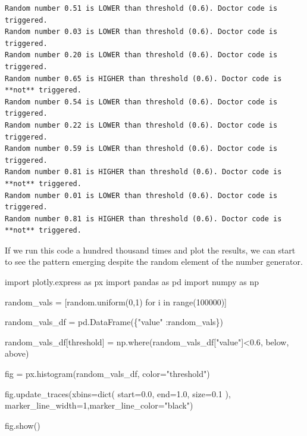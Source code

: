 \documentclass[
  letterpaper,
  DIV=11,
  numbers=noendperiod]{scrreprt}
\newenvironment{Shaded}{\begin{snugshade}}{\end{snugshade}}
\newcommand{\BuiltInTok}[1]{\textcolor[rgb]{0.00,0.23,0.31}{#1}}
\newcommand{\ControlFlowTok}[1]{\textcolor[rgb]{0.00,0.23,0.31}{#1}}
\newcommand{\DecValTok}[1]{\textcolor[rgb]{0.68,0.00,0.00}{#1}}
\newcommand{\FloatTok}[1]{\textcolor[rgb]{0.68,0.00,0.00}{#1}}
\newcommand{\ImportTok}[1]{\textcolor[rgb]{0.00,0.46,0.62}{#1}}
\newcommand{\KeywordTok}[1]{\textcolor[rgb]{0.00,0.23,0.31}{#1}}
\newcommand{\NormalTok}[1]{\textcolor[rgb]{0.00,0.23,0.31}{#1}}
\newcommand{\OperatorTok}[1]{\textcolor[rgb]{0.37,0.37,0.37}{#1}}
\newcommand{\StringTok}[1]{\textcolor[rgb]{0.13,0.47,0.30}{#1}}
\begin{document}
\begin{verbatim}
Random number 0.51 is LOWER than threshold (0.6). Doctor code is triggered.
Random number 0.03 is LOWER than threshold (0.6). Doctor code is triggered.
Random number 0.20 is LOWER than threshold (0.6). Doctor code is triggered.
Random number 0.65 is HIGHER than threshold (0.6). Doctor code is **not** triggered.
Random number 0.54 is LOWER than threshold (0.6). Doctor code is triggered.
Random number 0.22 is LOWER than threshold (0.6). Doctor code is triggered.
Random number 0.59 is LOWER than threshold (0.6). Doctor code is triggered.
Random number 0.81 is HIGHER than threshold (0.6). Doctor code is **not** triggered.
Random number 0.01 is LOWER than threshold (0.6). Doctor code is triggered.
Random number 0.81 is HIGHER than threshold (0.6). Doctor code is **not** triggered.
\end{verbatim}

If we run this code a hundred thousand times and plot the results, we
can start to see the pattern emerging despite the random element of the
number generator.

\begin{Shaded}
\begin{Highlighting}[]
\ImportTok{import}\NormalTok{ plotly.express }\ImportTok{as}\NormalTok{ px}
\ImportTok{import}\NormalTok{ pandas }\ImportTok{as}\NormalTok{ pd}
\ImportTok{import}\NormalTok{ numpy }\ImportTok{as}\NormalTok{ np}

\NormalTok{random\_vals }\OperatorTok{=}\NormalTok{ [random.uniform(}\DecValTok{0}\NormalTok{,}\DecValTok{1}\NormalTok{) }\ControlFlowTok{for}\NormalTok{ i }\KeywordTok{in} \BuiltInTok{range}\NormalTok{(}\DecValTok{100000}\NormalTok{)]}

\NormalTok{random\_vals\_df }\OperatorTok{=}\NormalTok{ pd.DataFrame(\{}\StringTok{"value"}\NormalTok{ :random\_vals\})}

\NormalTok{random\_vals\_df[}\StringTok{\textquotesingle{}threshold\textquotesingle{}}\NormalTok{] }\OperatorTok{=}\NormalTok{ np.where(random\_vals\_df[}\StringTok{"value"}\NormalTok{]}\OperatorTok{\textless{}}\FloatTok{0.6}\NormalTok{, }\StringTok{\textquotesingle{}below\textquotesingle{}}\NormalTok{, }\StringTok{\textquotesingle{}above\textquotesingle{}}\NormalTok{)}

\NormalTok{fig }\OperatorTok{=}\NormalTok{ px.histogram(random\_vals\_df, color}\OperatorTok{=}\StringTok{"threshold"}\NormalTok{)}

\NormalTok{fig.update\_traces(xbins}\OperatorTok{=}\BuiltInTok{dict}\NormalTok{(}
\NormalTok{        start}\OperatorTok{=}\FloatTok{0.0}\NormalTok{,}
\NormalTok{        end}\OperatorTok{=}\FloatTok{1.0}\NormalTok{,}
\NormalTok{        size}\OperatorTok{=}\FloatTok{0.1}
\NormalTok{    ),}
\NormalTok{    marker\_line\_width}\OperatorTok{=}\DecValTok{1}\NormalTok{,marker\_line\_color}\OperatorTok{=}\StringTok{"black"}\NormalTok{)}


\NormalTok{fig.show()}
\end{Highlighting}
\end{Shaded}
\end{document}
